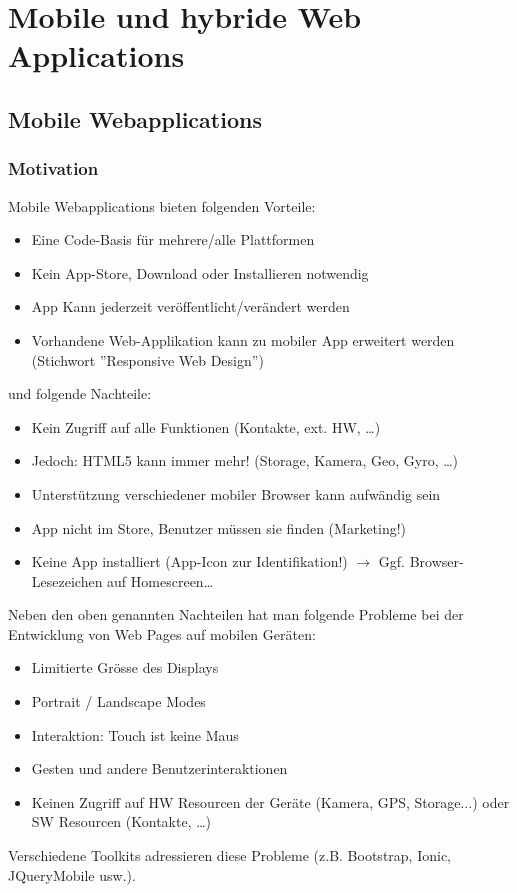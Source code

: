 \chapter{Mobile und hybride Web Applications}

\section{Mobile Webapplications}

\subsection{Motivation}

Mobile Webapplications bieten folgenden Vorteile:
\begin{itemize}
	\item Eine Code-Basis für mehrere/alle Plattformen
	\item Kein App-Store, Download oder Installieren notwendig
	\item App Kann jederzeit veröffentlicht/verändert werden
	\item Vorhandene Web-Applikation kann zu mobiler App erweitert werden (Stichwort ''Responsive Web Design'')
\end{itemize}
und folgende Nachteile:
\begin{itemize}
	\item Kein Zugriff auf alle Funktionen (Kontakte, ext. HW, \dots)
	\item Jedoch: HTML5 kann immer mehr! (Storage, Kamera, Geo, Gyro, \dots)
	\item Unterstützung verschiedener mobiler Browser kann aufwändig sein
	\item App nicht im Store, Benutzer müssen sie finden (Marketing!)
	\item Keine App installiert (App-Icon zur Identifikation!) $\rightarrow$ Ggf. Browser-Lesezeichen auf Homescreen\dots
\end{itemize}
Neben den oben genannten Nachteilen hat man folgende Probleme bei der Entwicklung von Web Pages auf mobilen Geräten:
\begin{itemize}
	\item Limitierte Grösse des Displays
	\item Portrait / Landscape Modes
	\item Interaktion: Touch ist keine Maus
	\item Gesten und andere Benutzerinteraktionen
	\item Keinen Zugriff auf HW Resourcen der Geräte (Kamera, GPS, Storage...) oder SW Resourcen (Kontakte, \dots)
\end{itemize}
Verschiedene Toolkits adressieren diese Probleme (z.B. Bootstrap, Ionic, JQueryMobile usw.).

